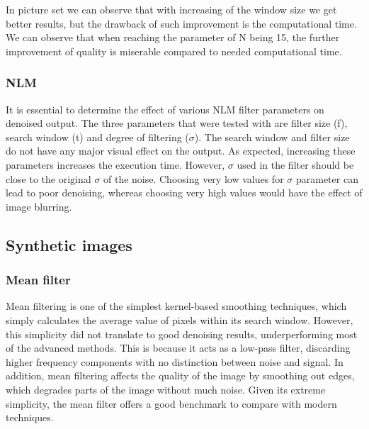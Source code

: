 In picture set we can observe that with increasing of the window size we get better results, but the drawback of such improvement is the computational time. We can observe that when reaching the parameter of N being 15, the further improvement of quality is miserable compared to needed computational time.

\subsubsection{NLM}
It is essential to determine the effect of various NLM filter parameters on denoised output. The three parameters that were tested with are filter size (f), search window (t) and degree of filtering (\(\sigma\)). The search window and filter size do not have any major visual effect on the output. As expected, increasing these parameters increases the execution time. However, \(\sigma\) used in the filter should be close to the original \(\sigma\) of the noise. Choosing very low values for \(\sigma\) parameter can lead to poor denoising, whereas choosing very high values would have the effect of image blurring. 

\subsection{Synthetic images} \label{sc:results_synthetic}

\subsubsection{Mean filter}
	Mean filtering is one of the simplest kernel-based smoothing techniques, which simply calculates the average value of pixels within its search window. However, this simplicity did not translate to good denoising results, underperforming most of the advanced methods. This is because it acts as a low-pass filter, discarding higher frequency components with no distinction between noise and signal. In addition, mean filtering affects the quality of the image by smoothing out edges, which degrades parts of the image without much noise. Given its extreme simplicity, the mean filter offers a good benchmark to compare with modern techniques.

